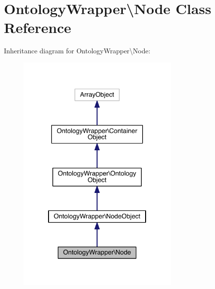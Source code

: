 \hypertarget{class_ontology_wrapper_1_1_node}{\section{Ontology\-Wrapper\textbackslash{}Node Class Reference}
\label{class_ontology_wrapper_1_1_node}
}


Inheritance diagram for Ontology\-Wrapper\textbackslash{}Node\-:
\nopagebreak
\begin{figure}[H]
\begin{center}
\leavevmode
\includegraphics[width=228pt]{class_ontology_wrapper_1_1_node__inherit__graph}
\end{center}
\end{figure}


